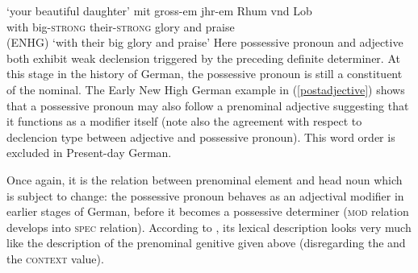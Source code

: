 \documentclass[output=paper
	        ,collection
	        ,collectionchapter
 	        ,biblatex
                ,babelshorthands
                ,newtxmath
                ,draftmode
                ,colorlinks, citecolor=brown
]{./langsci/langscibook}
\begin{document}
\glt `your beautiful daughter'
\ex \label{postadjective}
\gll mit gross-em jhr-em Rhum vnd Lob \\ with big-\textsc{strong} their-\textsc{strong} glory and praise   \\ \hfill (ENHG)
\glt `with their big glory and praise'
\zl
Here possessive pronoun and adjective both exhibit weak declension triggered by the preceding definite determiner. At this stage in the history of German, the possessive pronoun is still a constituent of the nominal. The Early New High German example in (\ref{postadjective}) shows that a possessive pronoun may also follow a prenominal adjective suggesting that it functions as a modifier itself (note also the agreement with respect to declencion type between adjective and possessive pronoun). This word order is excluded in Present-day German.

Once again, it is the relation between prenominal element and head noun which is subject to change: the possessive pronoun behaves as an adjectival modifier in earlier stages of German, before it becomes a possessive determiner (\ie \textsc{mod} relation develops into \textsc{spec} relation). According to \cite[54]{PoSa94}, its lexical description looks very much like the description of the prenominal genitive given above (disregarding the \content and the \textsc{context} value).
\end{document}
